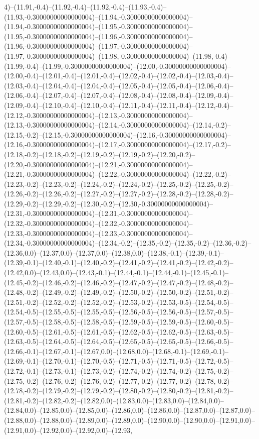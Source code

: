 4)--(11.91,-0.4)--(11.92,-0.4)--(11.92,-0.4)--(11.93,-0.4)--(11.93,-0.30000000000000004)--(11.94,-0.30000000000000004)--(11.94,-0.30000000000000004)--(11.95,-0.30000000000000004)--(11.95,-0.30000000000000004)--(11.96,-0.30000000000000004)--(11.96,-0.30000000000000004)--(11.97,-0.30000000000000004)--(11.97,-0.30000000000000004)--(11.98,-0.30000000000000004)--(11.98,-0.4)--(11.99,-0.4)--(11.99,-0.30000000000000004)--(12.00,-0.30000000000000004)--(12.00,-0.4)--(12.01,-0.4)--(12.01,-0.4)--(12.02,-0.4)--(12.02,-0.4)--(12.03,-0.4)--(12.03,-0.4)--(12.04,-0.4)--(12.04,-0.4)--(12.05,-0.4)--(12.05,-0.4)--(12.06,-0.4)--(12.06,-0.4)--(12.07,-0.4)--(12.07,-0.4)--(12.08,-0.4)--(12.08,-0.4)--(12.09,-0.4)--(12.09,-0.4)--(12.10,-0.4)--(12.10,-0.4)--(12.11,-0.4)--(12.11,-0.4)--(12.12,-0.4)--(12.12,-0.30000000000000004)--(12.13,-0.30000000000000004)--(12.13,-0.30000000000000004)--(12.14,-0.30000000000000004)--(12.14,-0.2)--(12.15,-0.2)--(12.15,-0.30000000000000004)--(12.16,-0.30000000000000004)--(12.16,-0.30000000000000004)--(12.17,-0.30000000000000004)--(12.17,-0.2)--(12.18,-0.2)--(12.18,-0.2)--(12.19,-0.2)--(12.19,-0.2)--(12.20,-0.2)--(12.20,-0.30000000000000004)--(12.21,-0.30000000000000004)--(12.21,-0.30000000000000004)--(12.22,-0.30000000000000004)--(12.22,-0.2)--(12.23,-0.2)--(12.23,-0.2)--(12.24,-0.2)--(12.24,-0.2)--(12.25,-0.2)--(12.25,-0.2)--(12.26,-0.2)--(12.26,-0.2)--(12.27,-0.2)--(12.27,-0.2)--(12.28,-0.2)--(12.28,-0.2)--(12.29,-0.2)--(12.29,-0.2)--(12.30,-0.2)--(12.30,-0.30000000000000004)--(12.31,-0.30000000000000004)--(12.31,-0.30000000000000004)--(12.32,-0.30000000000000004)--(12.32,-0.30000000000000004)--(12.33,-0.30000000000000004)--(12.33,-0.30000000000000004)--(12.34,-0.30000000000000004)--(12.34,-0.2)--(12.35,-0.2)--(12.35,-0.2)--(12.36,-0.2)--(12.36,0.0)--(12.37,0.0)--(12.37,0.0)--(12.38,0.0)--(12.38,-0.1)--(12.39,-0.1)--(12.39,-0.1)--(12.40,-0.1)--(12.40,-0.2)--(12.41,-0.2)--(12.41,-0.2)--(12.42,-0.2)--(12.42,0.0)--(12.43,0.0)--(12.43,-0.1)--(12.44,-0.1)--(12.44,-0.1)--(12.45,-0.1)--(12.45,-0.2)--(12.46,-0.2)--(12.46,-0.2)--(12.47,-0.2)--(12.47,-0.2)--(12.48,-0.2)--(12.48,-0.2)--(12.49,-0.2)--(12.49,-0.2)--(12.50,-0.2)--(12.50,-0.2)--(12.51,-0.2)--(12.51,-0.2)--(12.52,-0.2)--(12.52,-0.2)--(12.53,-0.2)--(12.53,-0.5)--(12.54,-0.5)--(12.54,-0.5)--(12.55,-0.5)--(12.55,-0.5)--(12.56,-0.5)--(12.56,-0.5)--(12.57,-0.5)--(12.57,-0.5)--(12.58,-0.5)--(12.58,-0.5)--(12.59,-0.5)--(12.59,-0.5)--(12.60,-0.5)--(12.60,-0.5)--(12.61,-0.5)--(12.61,-0.5)--(12.62,-0.5)--(12.62,-0.5)--(12.63,-0.5)--(12.63,-0.5)--(12.64,-0.5)--(12.64,-0.5)--(12.65,-0.5)--(12.65,-0.5)--(12.66,-0.5)--(12.66,-0.1)--(12.67,-0.1)--(12.67,0.0)--(12.68,0.0)--(12.68,-0.1)--(12.69,-0.1)--(12.69,-0.1)--(12.70,-0.1)--(12.70,-0.5)--(12.71,-0.5)--(12.71,-0.5)--(12.72,-0.5)--(12.72,-0.1)--(12.73,-0.1)--(12.73,-0.2)--(12.74,-0.2)--(12.74,-0.2)--(12.75,-0.2)--(12.75,-0.2)--(12.76,-0.2)--(12.76,-0.2)--(12.77,-0.2)--(12.77,-0.2)--(12.78,-0.2)--(12.78,-0.2)--(12.79,-0.2)--(12.79,-0.2)--(12.80,-0.2)--(12.80,-0.2)--(12.81,-0.2)--(12.81,-0.2)--(12.82,-0.2)--(12.82,0.0)--(12.83,0.0)--(12.83,0.0)--(12.84,0.0)--(12.84,0.0)--(12.85,0.0)--(12.85,0.0)--(12.86,0.0)--(12.86,0.0)--(12.87,0.0)--(12.87,0.0)--(12.88,0.0)--(12.88,0.0)--(12.89,0.0)--(12.89,0.0)--(12.90,0.0)--(12.90,0.0)--(12.91,0.0)--(12.91,0.0)--(12.92,0.0)--(12.92,0.0)--(12.93,